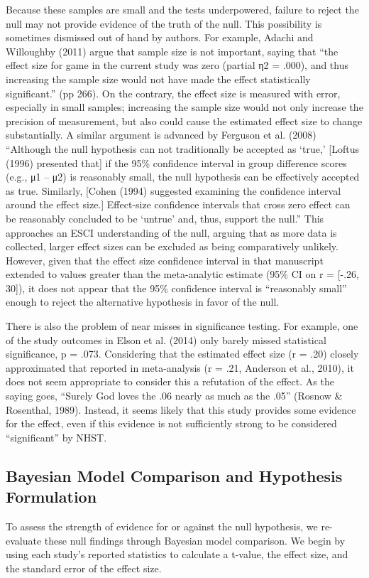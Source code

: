 \documentclass{article}
\begin{document}
Because these samples are small and the tests underpowered, failure to reject the null may not provide evidence of the truth of the null.  This possibility is sometimes dismissed out of hand by authors. For example, Adachi and Willoughby (2011) argue that sample size is not important, saying that “the effect size for game in the current study was zero (partial η2 = .000), and thus increasing the sample size would not have made the effect statistically significant.” (pp 266).  On the contrary, the effect size is measured with error, especially in small samples; increasing the sample size would not only increase the precision of measurement, but also could cause the estimated effect size to change substantially. A similar argument is advanced by Ferguson et al. (2008) “Although the null hypothesis can not traditionally be accepted as ‘true,’ [Loftus (1996) presented that] if the 95\% confidence interval in group difference scores (e.g., μ1 – μ2) is reasonably small, the null hypothesis can be effectively accepted as true. Similarly, [Cohen (1994) suggested examining the confidence interval around the effect size.] Effect-size confidence intervals that cross zero effect can be reasonably concluded to be ‘untrue’ and, thus, support the null.”   This approaches an ESCI understanding of the null, arguing that as more data is collected, larger effect sizes can be excluded as being comparatively unlikely. However, given that the effect size confidence interval in that manuscript extended to values greater than the meta-analytic estimate (95\% CI on r = [-.26, 30]), it does not appear that the 95\% confidence interval is “reasonably small” enough to reject the alternative hypothesis in favor of the null.

There is also the problem of near misses in significance testing. For example, one of the study outcomes in Elson et al. (2014) only barely missed statistical significance, p = .073. Considering that the estimated effect size (r = .20) closely approximated that reported in meta-analysis (r = .21, Anderson et al., 2010), it does not seem appropriate to consider this a refutation of the effect. As the saying goes, “Surely God loves the .06 nearly as much as the .05” (Rosnow \& Rosenthal, 1989). Instead, it seems likely that this study provides some evidence for the effect, even if this evidence is not sufficiently strong to be considered “significant” by NHST. 

\subsection{Bayesian Model Comparison and Hypothesis Formulation}
To assess the strength of evidence for or against the null hypothesis, we re-evaluate these null findings through Bayesian model comparison. We begin by using each study’s reported statistics to calculate a t-value, the effect size, and the standard error of the effect size.
\end{document}
